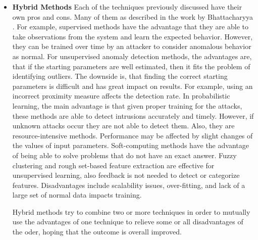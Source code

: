 \begin{itemize}
		\item \textbf{Hybrid Methods}
		\label{hybridmethods}
Each of the techniques previously discussed have their own pros and cons. Many of them as  described in the work by Bhattacharyya \etAl \cite{Bhattacharyya:2013:NAD:2505468}. For example, supervised methods have the advantage that they are able to take observations from the system and learn the expected behavior. However, they can be trained over time by an attacker to consider anomalous behavior as normal. 
For unsupervised anomaly detection methods, the advantages are, that if the starting parameters are well estimated, then it fits the problem of identifying outliers. The downside is, that finding the correct starting parameters is difficult and has great impact on results. For example, using an incorrect proximity measure affects the detection rate. 
In probabilistic learning, the main advantage is that given proper training for the attacks, these methods are able to detect intrusions accurately and timely. However, if unknown attacks occur they are not able to detect them. Also, they are resource-intensive methods. Performance may be affected by slight changes of the values of input parameters.
Soft-computing methods have the advantage of being able to solve problems that do not have an exact answer. Fuzzy clustering and rough set-based feature extraction are effective for unsupervised learning, also feedback is not needed to detect or categorize features. Disadvantages include scalability issues, over-fitting, and lack of a large set of normal data impacts training. 


Hybrid methods try to combine two or more techniques in order to mutually use the advantages of one technique to relieve some or all disadvantages of the oder, hoping that the outcome is overall improved.


\end{itemize}
